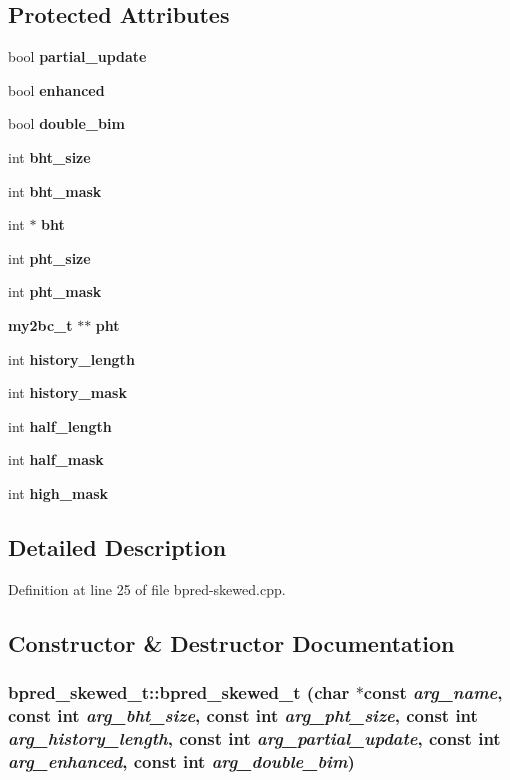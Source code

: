 \subsection*{Protected Attributes}
\begin{CompactItemize}
\item 
bool {\bf partial\_\-update}
\item 
bool {\bf enhanced}
\item 
bool {\bf double\_\-bim}
\item 
int {\bf bht\_\-size}
\item 
int {\bf bht\_\-mask}
\item 
int $\ast$ {\bf bht}
\item 
int {\bf pht\_\-size}
\item 
int {\bf pht\_\-mask}
\item 
{\bf my2bc\_\-t} $\ast$$\ast$ {\bf pht}
\item 
int {\bf history\_\-length}
\item 
int {\bf history\_\-mask}
\item 
int {\bf half\_\-length}
\item 
int {\bf half\_\-mask}
\item 
int {\bf high\_\-mask}
\end{CompactItemize}


\subsection{Detailed Description}


Definition at line 25 of file bpred-skewed.cpp.

\subsection{Constructor \& Destructor Documentation}
\subsubsection[{bpred\_\-skewed\_\-t}]{\setlength{\rightskip}{0pt plus 5cm}bpred\_\-skewed\_\-t::bpred\_\-skewed\_\-t (char $\ast$const  {\em arg\_\-name}, \/  const int {\em arg\_\-bht\_\-size}, \/  const int {\em arg\_\-pht\_\-size}, \/  const int {\em arg\_\-history\_\-length}, \/  const int {\em arg\_\-partial\_\-update}, \/  const int {\em arg\_\-enhanced}, \/  const int {\em arg\_\-double\_\-bim})\hspace{0.3cm}{\tt  [inline]}}\label{classbpred__skewed__t_2e3e49d261a8a787b36c421c688b6c99}




